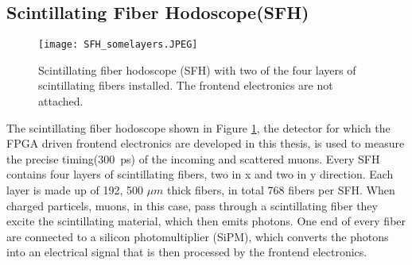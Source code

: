 \subsection{Scintillating Fiber Hodoscope(SFH)}
\begin{figure}[H]
	\centering
	\texttt{[image: SFH\_somelayers.JPEG]}
	\caption{Scintillating fiber hodoscope (SFH) with two of the four layers of scintillating fibers installed. The frontend electronics are not attached.\autocite{InternalcommunicationKarl}}
	\label{SFHpicture}
\end{figure}
The scintillating fiber hodoscope shown in Figure \ref{SFHpicture}, 
the detector for which the FPGA driven frontend electronics are developed in this thesis,
is used to measure the precise timing(\SI{300}{\pico\second}\Autocite{Amber2022Status}) of the incoming and scattered muons. 
Every SFH contains four layers of scintillating fibers, two in x and two in y direction.
Each layer is made up of 192\autocite{Amber2022Status}, 500 $\mu m$ thick\autocite{Amber2024Status} fibers, in total 768\autocite{Amber2022Status} fibers per SFH. 
When charged particels, muons, in this case, pass through a scintillating fiber they excite the scintillating material, 
which then emits photons. One end of every fiber are connected to a silicon photomultiplier (SiPM), which converts the photons into an electrical signal
that is then processed by the frontend electronics.\autocite{InternalcommunicationKarl}


